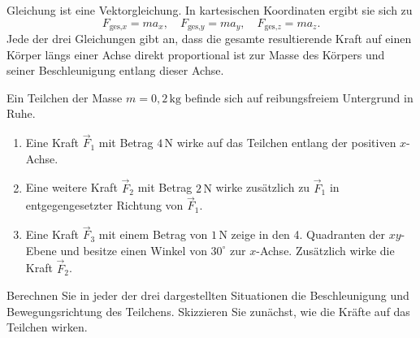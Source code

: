 \begin{MContent}
               Gleichung  ist eine Vektorgleichung. In kartesischen Koordinaten ergibt sie sich zu
               \begin{equation*}
               F_{\text{ges,$x$}}=ma_x,\quad F_{\text{ges,$y$}}=ma_y, \quad F_{\text{ges,$z$}}=ma_z.
                \end{equation*} Jede der drei Gleichungen gibt an, dass die gesamte resultierende Kraft auf einen K\"orper l\"angs einer Achse direkt proportional ist zur Masse des K\"orpers und seiner Beschleunigung entlang dieser Achse.\\
                
               \end{MContent} 
               
              \begin{MExercises}

               \begin{MExercise}
               Ein Teilchen der Masse $m={0,2}\,\text{kg}$ befinde sich auf reibungsfreiem Untergrund in Ruhe. 
               \begin{enumerate}
               \item Eine Kraft $\vec{F}_1$ mit Betrag $4\,\text{N}$ wirke auf das Teilchen entlang der positiven $x$-Achse.
               \item Eine weitere Kraft  $\vec{F}_2$ mit Betrag $2\,\text{N}$ wirke zus\"atzlich zu $\vec{F}_1$  in entgegengesetzter Richtung von $\vec{F}_1$.
               \item Eine Kraft $\vec{F}_3$ mit einem Betrag von $1\,\text{N}$ zeige in den 4. Quadranten der $xy$-Ebene und besitze einen Winkel von $30^{\circ}$ zur $x$-Achse. Zus\"atzlich wirke die Kraft $\vec{F}_2$.
               \end{enumerate}
               Berechnen Sie in jeder der drei dargestellten Situationen die Beschleunigung und Bewegungsrichtung des Teilchens. Skizzieren Sie zun\"achst, wie die Kr\"afte auf das Teilchen wirken. 
               
               
               \begin{MSolution}
               
               

\end{MSolution}
\end{MExercise}
\end{MExercises}
